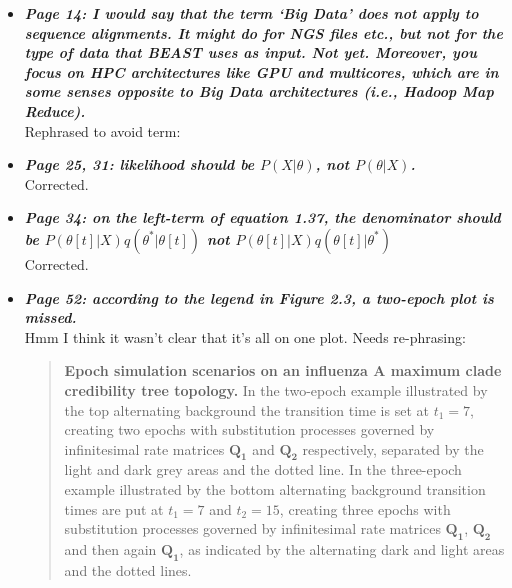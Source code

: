 \documentclass[english]{article}
\begin{document}
\begin{itemize}
\item {
{\it
\textbf{
Page 14: I would say that the term `Big Data' does not apply to sequence alignments. 
It might do for NGS files etc., but not for the type of data that BEAST uses as input. 
Not yet. 
Moreover, you focus on HPC architectures like GPU and multicores, which are in some senses opposite to Big Data architectures (i.e., Hadoop Map Reduce).
}%
}%
}%
\\
Rephrased to avoid term:

\begin{quote}
\myeditDPfive
\end{quote}


\item {
{\it
\textbf{
Page 25, 31: likelihood should be $P(X| \theta)$, not $P(\theta | X)$.
}%
}%
}%
\\
Corrected.


\item {
{\it
\textbf{
Page 34: on the left-term of equation 1.37, the denominator should be
$P(\theta[t]|X) q(\theta^{*} | \theta[t])$
not 
$P(\theta[t]|X) q(\theta[t] | \theta^{*})$
}%
}%
}%
\\
Corrected.


\item {
{\it
\textbf{
Page 52: according to the legend in Figure 2.3, a two-epoch plot is missed.
}%
}%
}%
\\
Hmm I think it wasn't clear that it's all on one plot. Needs re-phrasing:

\begin{quote}
{\bf  Epoch simulation scenarios on an influenza A maximum clade credibility tree topology.} 
In the two-epoch example illustrated by the top alternating background
the transition time is set at $t_{1}=7$, creating two epochs with substitution processes governed by infinitesimal rate matrices $\mathbf{Q_{1}}$ and $\mathbf{Q_{2}}$ respectively, separated by the light and dark grey areas and the dotted line.
In the three-epoch example illustrated 
by the bottom alternating background
transition times are put at $t_{1}=7$ and $t_{2}=15$, creating three epochs with substitution processes governed by infinitesimal rate matrices $\mathbf{Q_{1}}$, $\mathbf{Q_{2}}$ and then again $\mathbf{Q_{1}}$, as indicated by the alternating dark and light areas and the dotted lines.
\end{quote}











\end{itemize}











%
\end{document}

